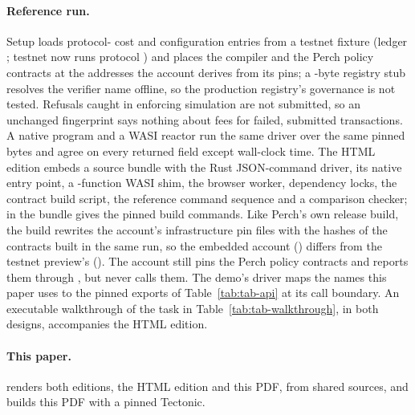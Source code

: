 \paragraph{Reference run.} Setup loads protocol- cost and
configuration entries from a testnet fixture (ledger ;
testnet now runs protocol ) and places the compiler and the
Perch  policy contracts at the addresses the
account derives from its pins; a -byte registry stub
resolves the verifier name  offline, so the
production registry's governance is not tested. Refusals caught in enforcing simulation are not submitted,
so an unchanged fingerprint says nothing about fees for failed, submitted
transactions. A native program and a WASI reactor run the same driver over the same pinned bytes and agree on every
returned field except wall-clock time. The HTML edition embeds a source bundle
with the Rust JSON-command driver, its native entry point, a
-function WASI shim, the browser worker, dependency
locks, the contract build script, the reference command sequence and a
comparison checker;  in the bundle gives
the pinned build commands. Like Perch's own release build, the build rewrites the
account's infrastructure pin files with the hashes of the contracts built in the
same run, so the embedded account () differs from
the testnet preview's (). The account still pins
the Perch  policy contracts and reports them
through , but never calls them. The demo's driver maps the names
this paper uses to the pinned exports of Table~\ref{tab:tab-api} at its call
boundary. An executable walkthrough of the task in
Table~\ref{tab:tab-walkthrough}, in both designs, accompanies the HTML edition.

\paragraph{This paper.}  renders
both editions, the HTML edition and this PDF, from shared sources, and
 builds this PDF with a pinned Tectonic.



